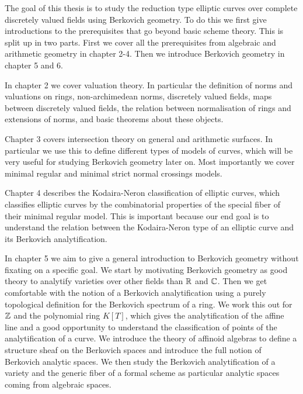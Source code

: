 The goal of this thesis is to study the reduction type elliptic curves over complete discretely valued fields using Berkovich geometry. 
To do this we first give introductions to the prerequisites that go beyond basic scheme theory.
This is split up in two parts. First we cover all the prerequisites from algebraic and arithmetic geometry in chapter 2-4. 
Then we introduce Berkovich geometry in chapter 5 and 6. 

\medskip

In chapter 2 we cover valuation theory. In particular the definition of norms and valuations on rings, non-archimedean norms, discretely valued fields, maps between discretely valued fields, the relation between normalisation of rings and extensions of norms, and basic theorems about these objects. 

Chapter 3 covers intersection theory on general and arithmetic surfaces. 
In particular we use this to define different types of models of curves, which will be very useful for studying Berkovich geometry later on. Most importantly we cover minimal regular and minimal strict normal crossings models.

Chapter 4 describes the Kodaira-Neron classification of elliptic curves, which classifies elliptic curves by the combinatorial properties of the special fiber of their minimal regular model. 
This is important because our end goal is to understand the relation between the Kodaira-Neron type of an elliptic curve and its Berkovich analytification.

\medskip


In chapter 5 we aim to give a general introduction to Berkovich geometry without fixating on a specific goal. 
We start by motivating Berkovich geometry as good theory to analytify varieties over other fields than $\mathbb{R}$ and $\mathbb{C}$. 
Then we get comfortable with the notion of a Berkovich analytification using a purely topological definition for the Berkovich spectrum of a ring. 
We work this out for $\mathbb{Z}$ and the polynomial ring $K[T]$, which gives the analytification of the affine line and a good opportunity to understand the classification of points of the analytification of a curve. 
We introduce the theory of affinoid algebras to define a structure sheaf on the Berkovich spaces and introduce the full notion of Berkovich analytic spaces. 
We then study the Berkovich analytification of a variety and the generic fiber of a formal scheme as particular analytic spaces coming from algebraic spaces. 

